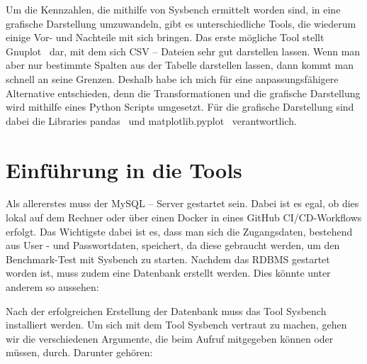 Um die Kennzahlen, die mithilfe von Sysbench ermittelt worden sind, in eine grafische Darstellung umzuwandeln, gibt es unterschiedliche Tools, die wiederum einige Vor- und Nachteile mit sich bringen.
Das erste mögliche Tool stellt Gnuplot~\cite{gnuplot} dar, mit dem sich CSV – Dateien sehr gut darstellen lassen.
Wenn man aber nur bestimmte Spalten aus der Tabelle darstellen lassen, dann kommt man schnell an seine Grenzen.
Deshalb habe ich mich für eine anpassungsfähigere Alternative entschieden, denn die Transformationen und die grafische Darstellung wird mithilfe eines Python Scripts umgesetzt.
Für die grafische Darstellung sind dabei die Libraries pandas~\cite{reback2020pandas} und matplotlib.pyplot~\cite{hunter_2007} verantwortlich.

\section{Einführung in die Tools}\label{sec:einfuhrung-in-die-tools}

Als allererstes muss der MySQL – Server gestartet sein.
Dabei ist es egal, ob dies lokal auf dem Rechner oder über einen Docker in eines GitHub CI/CD-Workflows erfolgt.
Das Wichtigste dabei ist es, dass man sich die Zugangsdaten, bestehend aus User - und Passwortdaten, speichert, da diese gebraucht werden, um den Benchmark-Test mit Sysbench zu starten.
Nachdem das RDBMS gestartet worden ist, muss zudem eine Datenbank erstellt werden.
Dies könnte unter anderem so aussehen:



Nach der erfolgreichen Erstellung der Datenbank muss das Tool Sysbench installiert werden.
Um sich mit dem Tool Sysbench vertraut zu machen, gehen wir die verschiedenen Argumente, die beim Aufruf mitgegeben können oder müssen, durch.
Darunter gehören:

